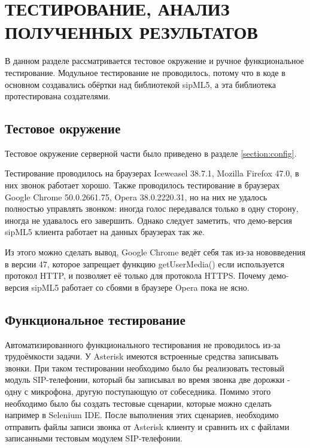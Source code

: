 \chapter{ТЕСТИРОВАНИЕ, АНАЛИЗ ПОЛУЧЕННЫХ РЕЗУЛЬТАТОВ}

В данном разделе рассматривается тестовое окружение и ручное функциональное тестирование. Модульное тестирование не проводилось, потому что в коде в основном создавались обёртки над библиотекой sipML5, а эта библиотека протестирована создателями.

\section{Тестовое окружение}

Тестовое окружение серверной части было приведено в разделе \ref{section:config}.

Тестирование проводилось на браузерах Iceweasel 38.7.1, Mozilla Firefox 47.0, в них звонок работает хорошо. Также проводилось тестирование в браузерах Google Chrome 50.0.2661.75, Opera 38.0.2220.31, но на них не удалось полностью управлять звонком: иногда голос передавался только в одну сторону, иногда не удавалось его завершить. Однако следует заметить, что демо-версия sipML5 клиента\cite{sipML5_demo} работает на данных браузерах так же.

Из этого можно сделать вывод, Google Chrome ведёт себя так из-за нововведения в версии 47, которое запрещает функцию getUserMedia() если используется протокол HTTP, и позволяет её только для протокола HTTPS.\cite{chrome_https} Почему демо-версия sipML5 работает со сбоями в браузере Opera пока не ясно.

\section{Функциональное тестирование}

Автоматизированного функционального тестирования не проводилось из-за трудоёмкости задачи. У Asterisk имеются встроенные средства записывать звонки. При таком тестировании необходимо было бы реализовать тестовый модуль SIP-телефонии, который бы записывал во время звонка две дорожки - одну с микрофона, другую поступающую от собеседника. Помимо этого необходимо было бы создать тестовые сценарии, которые можно сделать например в Selenium IDE. После выполнения этих сценариев, необходимо отправить файлы записи звонка от Asterisk клиенту и сравнить их с файлами записанными тестовым модулем SIP-телефонии.

